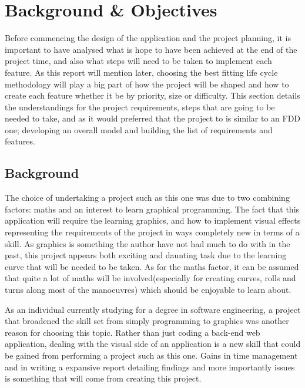 \chapter{Background \& Objectives}
Before commencing the design of the application and the project planning, it is important to have analysed what is hope to have been achieved at the end of the project time, and also what steps will need to be taken to implement each feature. As this report will mention later, choosing the best fitting life cycle methodology will play a big part of how the project will be shaped and how to create each feature whether it be by priority, size or difficulty. This section details the understandings for the project requirements, steps that are going to be needed to take, and as it would preferred that the project to is similar to an FDD one; developing an overall model and building the list of requirements and features.

\section{Background}
The choice of undertaking a project such as this one was due to two combining factors: maths and an interest to learn graphical programming. The fact that this application will require the learning graphics, and how to implement visual effects representing the requirements of the project in ways completely new in terms of a skill. As graphics is something the author have not had much to do with in the past, this project appears both exciting and daunting task due to the learning curve that will be needed to be taken. As for the maths factor, it can be assumed that quite a lot of maths will be involved(especially for creating curves, rolls and turns along most of the manoeuvres) which should be enjoyable to learn about.

As an individual currently studying for a degree in software engineering, a project that broadened the skill set from simply programming to graphics was another reason for choosing this topic. Rather than just coding a back-end web application, dealing with the visual side of an application is a new skill that could be gained from performing a project such as this one. Gains in time management and in writing a expansive report detailing findings and more importantly issues is something that will come from creating this project. 

